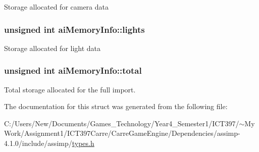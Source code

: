 Storage allocated for camera data \hypertarget{structai_memory_info_fcd2ccdfab49e2fce989413a362b8d35}{
\subsubsection[lights]{\setlength{\rightskip}{0pt plus 5cm}unsigned int {\bf aiMemoryInfo::lights}}}
\label{structai_memory_info_fcd2ccdfab49e2fce989413a362b8d35}


Storage allocated for light data \hypertarget{structai_memory_info_590739a4cef4876901d1cf6ff48f01b3}{
\subsubsection[total]{\setlength{\rightskip}{0pt plus 5cm}unsigned int {\bf aiMemoryInfo::total}}}
\label{structai_memory_info_590739a4cef4876901d1cf6ff48f01b3}


Total storage allocated for the full import. 

The documentation for this struct was generated from the following file:\begin{CompactItemize}
\item 
C:/Users/New/Documents/Games\_\-Technology/Year4\_\-Semester1/ICT397/$\sim$My Work/Assignment1/ICT397Carre/CarreGameEngine/Dependencies/assimp-4.1.0/include/assimp/\hyperlink{types_8h}{types.h}\end{CompactItemize}
